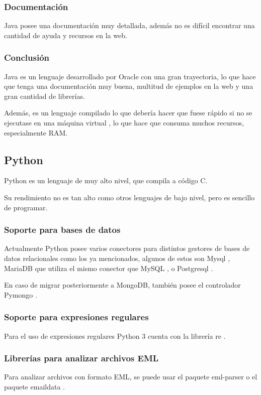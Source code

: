 \subsubsection{Documentación}
Java posee una documentación muy detallada, además no es difícil encontrar una cantidad de ayuda y recursos en la web. \cite{java_docu}

\subsubsection{Conclusión}
Java es un lenguaje desarrollado por Oracle con una gran trayectoria, lo que hace que tenga una documentación muy buena, multitud de ejemplos en la web y una gran cantidad de librerías.

Además, es un lenguaje compilado lo que debería hacer que fuese rápido si no se ejecutase en una máquina virtual \cite{java_vm}, lo que hace que consuma muchos recursos, especialmente RAM. 

\subsection{Python}
Python es un lenguaje de muy alto nivel, que compila a código C.

Su rendimiento no es tan alto como otros lenguajes de bajo nivel, pero es sencillo de programar. 

\subsubsection{Soporte para bases de datos}

Actualmente Python posee varios conectores para distintos gestores de bases de datos relacionales como los ya mencionados, algunos de estos son Mysql \cite{python_mysql}, MariaDB que utiliza el mismo conector que MySQL \cite{python_mariadb}, o Postgresql \cite{python_Postgresql}.

En caso de migrar posteriormente a MongoDB, también posee el controlador Pymongo \cite{python_MongoDB}.

\subsubsection{Soporte para expresiones regulares}
Para el uso de expresiones regulares Python 3 cuenta con la librería re \cite{python_regex}.

\subsubsection{Librerías para analizar archivos EML}
Para analizar archivos con formato EML, se puede usar el paquete eml-parser \cite{python_eml_parser} o el paquete emaildata \cite{python_emaildata}.

